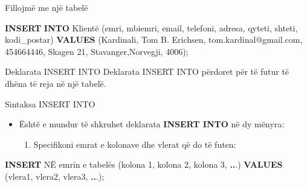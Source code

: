 \documentclass[
  ignorenonframetext,
]{beamer}
\newenvironment{Shaded}{\begin{snugshade}}{\end{snugshade}}
\newcommand{\DecValTok}[1]{\textcolor[rgb]{0.00,0.00,0.81}{#1}}
\newcommand{\KeywordTok}[1]{\textcolor[rgb]{0.13,0.29,0.53}{\textbf{#1}}}
\newcommand{\NormalTok}[1]{#1}
\newcommand{\OperatorTok}[1]{\textcolor[rgb]{0.81,0.36,0.00}{\textbf{#1}}}
\newcommand{\StringTok}[1]{\textcolor[rgb]{0.31,0.60,0.02}{#1}}
\providecommand{\tightlist}{%
  \setlength{\itemsep}{0pt}\setlength{\parskip}{0pt}}
\begin{document}
\begin{frame}[fragile]{Fillojmë me një tabelë}
\begin{Shaded}
\begin{Highlighting}[]
\KeywordTok{INSERT} \KeywordTok{INTO}\NormalTok{ Klientë (emri, mbiemri, email, telefoni, adresa, qyteti, shteti, kodi\_postar)}
\KeywordTok{VALUES}\NormalTok{ (}\StringTok{\textquotesingle{}Kardinali\textquotesingle{}}\NormalTok{, }\StringTok{\textquotesingle{}Tom B. Erichsen\textquotesingle{}}\NormalTok{, }\StringTok{\textquotesingle{}tom.kardinal@gmail.com\textquotesingle{}}\NormalTok{, }\StringTok{\textquotesingle{}454664446\textquotesingle{}}\NormalTok{, }\StringTok{\textquotesingle{}Skagen 21\textquotesingle{}}\NormalTok{, }\StringTok{\textquotesingle{}Stavanger\textquotesingle{}}\NormalTok{,}\StringTok{\textquotesingle{}Norvegji\textquotesingle{}}\NormalTok{, }\StringTok{\textquotesingle{}4006\textquotesingle{}}\NormalTok{);}
\end{Highlighting}
\end{Shaded}
\end{frame}

\begin{frame}{Deklarata INSERT INTO}
\label{deklarata-insert-into}
Deklarata INSERT INTO përdoret për të futur të dhëna të reja në një
tabelë.
\end{frame}

\begin{frame}[fragile]{Sintaksa INSERT INTO}
\label{sintaksa-insert-into}
\begin{itemize}
\item
  Është e mundur të shkruhet deklarata \textbf{INSERT INTO} në dy
  mënyra:

  \begin{enumerate}
  \tightlist
  \item
    Specifikoni emrat e kolonave dhe vlerat që do të futen:
  \end{enumerate}
\end{itemize}

\begin{Shaded}
\begin{Highlighting}[]
    \KeywordTok{INSERT}\NormalTok{ NË emrin e tabelës (kolona }\DecValTok{1}\NormalTok{, kolona }\DecValTok{2}\NormalTok{, kolona }\DecValTok{3}\NormalTok{, }\OperatorTok{..}\NormalTok{.)}
    \KeywordTok{VALUES}\NormalTok{ (vlera1, vlera2, vlera3, }\OperatorTok{..}\NormalTok{.);}
\end{Highlighting}
\end{Shaded}
\end{frame}
\end{document}
